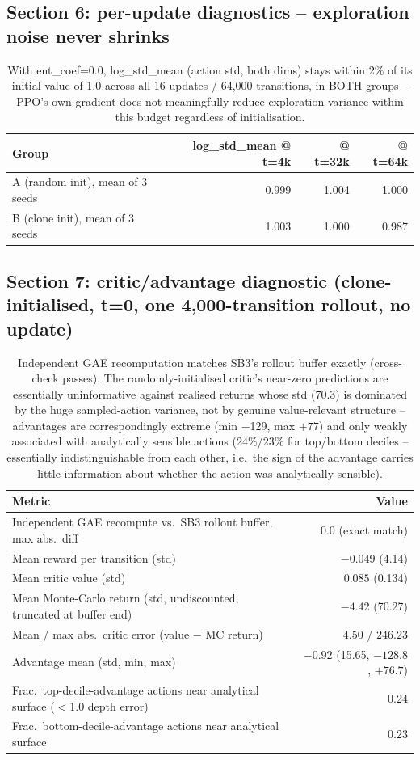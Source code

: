 \subsection*{Section 6: per-update diagnostics -- exploration noise never shrinks}
\begin{table}[h]
\centering
\begin{tabular}{lrrr}
\hline
Group & log\_std\_mean @ t=4k & @ t=32k & @ t=64k \\
\hline
A (random init), mean of 3 seeds & 0.999 & 1.004 & 1.000 \\
B (clone init), mean of 3 seeds  & 1.003 & 1.000 & 0.987 \\
\hline
\end{tabular}
\caption{With ent\_coef=0.0, log\_std\_mean (action std, both dims) stays
within 2\% of its initial value of 1.0 across all 16 updates / 64,000
transitions, in BOTH groups -- PPO's own gradient does not meaningfully
reduce exploration variance within this budget regardless of initialisation.}
\end{table}

\subsection*{Section 7: critic/advantage diagnostic (clone-initialised, t=0, one 4,000-transition rollout, no update)}
\begin{table}[h]
\centering
\begin{tabular}{lr}
\hline
Metric & Value \\
\hline
Independent GAE recompute vs.\ SB3 rollout buffer, max abs.\ diff & $0.0$ (exact match) \\
Mean reward per transition (std) & $-0.049$ (4.14) \\
Mean critic value (std) & $0.085$ (0.134) \\
Mean Monte-Carlo return (std, undiscounted, truncated at buffer end) & $-4.42$ (70.27) \\
Mean / max abs.\ critic error (value $-$ MC return) & $4.50$ / $246.23$ \\
Advantage mean (std, min, max) & $-0.92$ (15.65, $-128.8$, $+76.7$) \\
Frac.\ top-decile-advantage actions near analytical surface ($<$1.0 depth error) & 0.24 \\
Frac.\ bottom-decile-advantage actions near analytical surface & 0.23 \\
\hline
\end{tabular}
\caption{Independent GAE recomputation matches SB3's rollout buffer exactly
(cross-check passes). The randomly-initialised critic's near-zero
predictions are essentially uninformative against realised returns whose
std (70.3) is dominated by the huge sampled-action variance, not by genuine
value-relevant structure -- advantages are correspondingly extreme
(min $-$129, max $+77$) and only weakly associated with analytically
sensible actions (24\%/23\% for top/bottom deciles -- essentially
indistinguishable from each other, i.e.\ the sign of the advantage carries
little information about whether the action was analytically sensible).}
\end{table}

